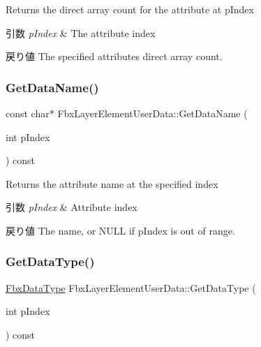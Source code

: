 Returns the direct array count for the attribute at p\+Index 
\begin{DoxyParams}{引数}
{\em p\+Index} & The attribute index \\
\hline
\end{DoxyParams}
\begin{DoxyReturn}{戻り値}
The specified attribute\textquotesingle{}s direct array count. 
\end{DoxyReturn}
\mbox{\label{class_fbx_layer_element_user_data_aba84f0175d90bd9e5b775391299e44fc}} 
\subsubsection{\texorpdfstring{Get\+Data\+Name()}{GetDataName()}}
{\footnotesize\ttfamily const char$\ast$ Fbx\+Layer\+Element\+User\+Data\+::\+Get\+Data\+Name (\begin{DoxyParamCaption}\item[{int}]{p\+Index }\end{DoxyParamCaption}) const}

Returns the attribute name at the specified index 
\begin{DoxyParams}{引数}
{\em p\+Index} & Attribute index \\
\hline
\end{DoxyParams}
\begin{DoxyReturn}{戻り値}
The name, or {\ttfamily N\+U\+LL} if p\+Index is out of range. 
\end{DoxyReturn}
\mbox{\label{class_fbx_layer_element_user_data_ace571a6982892b8b200c660589d22847}} 
\subsubsection{\texorpdfstring{Get\+Data\+Type()}{GetDataType()}\hspace{0.1cm}{\footnotesize\ttfamily [1/2]}}
{\footnotesize\ttfamily \hyperlink{class_fbx_data_type}{Fbx\+Data\+Type} Fbx\+Layer\+Element\+User\+Data\+::\+Get\+Data\+Type (\begin{DoxyParamCaption}\item[{int}]{p\+Index }\end{DoxyParamCaption}) const}

